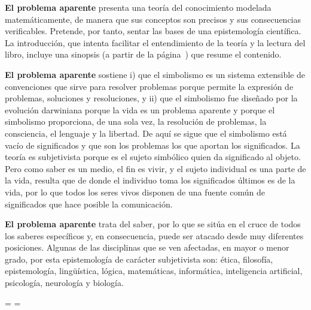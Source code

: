 \null
{\bf El problema aparente} presenta una teoría del conocimiento modelada
matemáticamente, de manera que sus conceptos son precisos y sus
consecuencias verificables. Pretende, por tanto, sentar las bases de una
epistemología científica. La introducción, que intenta facilitar el
entendimiento de la teoría y la lectura del libro, incluye una sinopsis (a
partir de la página~{}) que resume el contenido.

\null
{\bf El problema aparente} sostiene i) que el simbolismo es un sistema
extensible de convenciones que sirve para resolver problemas porque permite
la expresión de problemas, soluciones y resoluciones, y ii) que el
simbolismo fue diseñado por la evolución darwiniana porque la vida es un
problema aparente y porque el simbolismo proporciona, de una sola vez, la
resolución de problemas, la consciencia, el lenguaje y la libertad. De aquí
se sigue que el simbolismo está vacío de significados y que son los
problemas los que aportan los significados. La teoría es subjetivista porque
es el sujeto simbólico quien da significado al objeto. Pero como saber es un
medio, el fin es vivir, y el sujeto individual es una parte de la vida,
resulta que de donde el individuo toma los significados últimos es de la
vida, por lo que todos los seres vivos disponen de una fuente común de
significados que hace posible la comunicación.

\null
{\bf El problema aparente} trata del saber, por lo que se sitúa en el cruce
de todos los saberes específicos y, en consecuencia, puede ser atacado desde
muy diferentes posiciones. Algunas de las disciplinas que se ven afectadas,
en mayor o menor grado, por esta epistemología de carácter subjetivista son:
 ética, filosofía, epistemología,
 lingüística, lógica, matemáticas,
 informática, inteligencia artificial,
 psicología, neurología y biología.

\break %

\vsize=\vpage \advance\vsize-72bp \voffset=36bp \advance\voffset-1in
\hsize=\hpage \advance\hsize-72bp \hoffset=36bp \advance\hoffset-1in

%
%
% 


